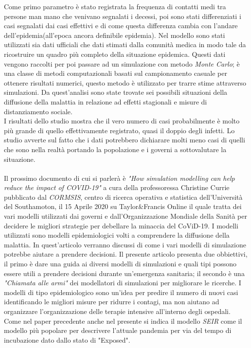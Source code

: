 \documentclass[12pt, openany]{book}
\begin{document}
		Come primo parametro è stato registrata la frequenza di contatti medi tra persone man mano che venivano segnalati i decessi, poi sono stati differenziati i casi segnalati dai casi effettivi e di come questa differenza cambia con l'andare dell'epidemia(all'epoca ancora definibile epidemia). Nel modello sono stati utilizzati sia dati ufficiali che dati stimati dalla comunità medica in modo tale da ricostruire un quadro più completo della situazione epidemica. Questi dati vengono raccolti per poi passare ad un simulazione con metodo \emph{Monte Carlo}; è una classe di metodi computazionali basati sul campionamento casuale per ottenere risultati numerici, questo metodo è utilizzato per trarre stime attraverso simulazioni.
		Da quest'analisi sono state trovate sei possibili situazioni della diffusione della malattia in relazione ad effetti stagionali e misure di distanziamento sociale.\\
		I risultati dello studio mostra che il vero numero di casi probabilmente è molto più grande di quello effettivamente registrato, quasi il doppio degli infetti. Lo studio avverte sul fatto che i dati potrebbero dichiarare molti meno casi di quelli che sono nella realtà portando la popolazione e i governi a sottovalutare la situazione.
		\\
		\\
		Il prossimo documento di cui si parlerà è \emph{"How simulation modelling can help reduce the impact of COVID-19"}\cite{Simulazioni} a cura della professoressa Christine Currie pubblicato dal \emph{CORMSIS}, centro di ricerca operativa e statistica dell'Università del Southamoton, il 15 Aprile 2020 su Taylor\&Francis Online il quale tratta dei vari modelli utilizzati dai governi e dall'Organizzazione Mondiale della Sanità per decidere le migliori strategie per debellare la minaccia del CoViD-19. I modelli utilizzati sono modelli epidemiologici volti a comprendere la diffusione della malattia. In quest'articolo verranno discussi di come i vari modelli di simulazione potrebbe aiutare a prendere decisioni.
		Il presente articolo presenta due obbiettivi, il primo è dare una guida ai diversi modelli di simulazioni e quali tipi possono essere utili a prendere decisioni durante un'emergenza sanitaria; il secondo è una \emph{"Chiamata alle armi"} dei modellatori di simulazioni per migliorare le ricerche.
		I modelli di tipo epidemiologico sono un'idea per predire il numero di nuovi casi identificando le migliori misure per ridurre i contagi, ma non aiutano ad organizzare l'organizzazione delle terapie intensive all'interno degli ospedali. Come nel paper precedente anche nel presente si indica il modello \emph{SEIR} come il modello più popolare per descrivere l'attuale pandemia per via del tempo di incubazione dato dallo stato di "Exposed".\\
\end{document}

